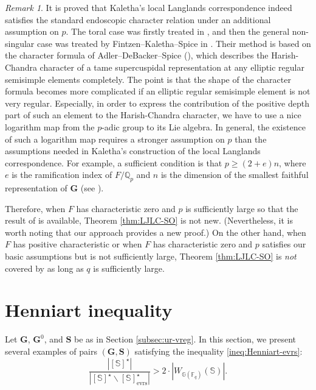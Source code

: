 \documentclass{amsart}
\newcommand{\evrs}{\mathrm{evrs}}
\newcommand{\F}{\mathbb{F}}
\newcommand{\bbQ}{\mathbb{Q}}
\newcommand{\bbS}{\mathbb{S}}
\newcommand{\bbG}{\mathbb{G}}
\newcommand{\bfG}{\mathbf{G}}
\newcommand{\bfS}{\mathbf{S}}
\theoremstyle{plain}
\theoremstyle{definition}
\theoremstyle{remark}
\newtheorem{rem}[thm]{Remark}
\theoremstyle{theorem}
\begin{document}
\begin{rem}
It is proved that Kaletha's local Langlands correspondence indeed satisfies the standard endoscopic character relation under an additional assumption on $p$.
The toral case was firstly treated in \cite[Theorem 6.3.4]{Kal19}, and then the general non-singular case was treated by Fintzen--Kaletha--Spice in \cite[Theorem 4.4.4]{FKS21}.
Their method is based on the character formula of Adler--DeBacker--Spice (\cite{AS09,DS18,Spi18,Spi21}), which describes the Harish-Chandra character of a tame supercuspidal representation at any elliptic regular semisimple elements completely.
The point is that the shape of the character formula becomes more complicated if an elliptic regular semisimple element is not very regular.
Especially, in order to express the contribution of the positive depth part of such an element to the Harish-Chandra character, we have to use a nice logarithm map from the $p$-adic group to its Lie algebra.
In general, the existence of such a logarithm map requires a stronger assumption on $p$ than the assumptions needed in Kaletha's construction of the local Langlands correspondence.
For example, a sufficient condition is that $p\geq (2+e)n$, where $e$ is the ramification index of $F/\bbQ_{p}$ and $n$ is the dimension of the smallest faithful representation of $\bfG$ (see \cite[Section 4.3]{Kal19-sc}).

Therefore, when $F$ has characteristic zero and $p$ is sufficiently large so that the result of \cite{FKS21} is available, Theorem \ref{thm:LJLC-SO} is not new.
(Nevertheless, it is worth noting that our approach provides a new proof.)
On the other hand, when $F$ has positive characteristic or when $F$ has characteristic zero and $p$ satisfies our basic assumptions but is not sufficiently large, Theorem \ref{thm:LJLC-SO} is \textit{not} covered by \cite{FKS21} as long as $q$ is sufficiently large.
\end{rem}


\newpage

\appendix


\section{Henniart inequality}\label{sec:henniart}

Let $\bfG$, $\bfG^{0}$, and $\bfS$ be as in Section \ref{subsec:ur-vreg}.
In this section, we present several examples of pairs $(\bfG,\bfS)$ satisfying the inequality \eqref{ineq:Henniart-evrs}:
\[
\frac{|[\bbS]^{\star}|}{|[\bbS]^{\star} \smallsetminus [\bbS]^{\star}_\evrs|} 
>
2\cdot|W_{\bbG(\F_{q})}(\bbS)|.
\]
\end{document}
